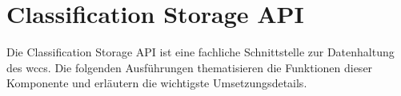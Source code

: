 \section{Classification Storage API}
    \label{section:solutionDetailsStorageAPI}
    Die Classification Storage API ist eine fachliche Schnittstelle zur Datenhaltung des \gls{wccs}.
    Die folgenden Ausführungen thematisieren die Funktionen dieser Komponente und erläutern die wichtigste Umsetzungsdetails.

    
    
    
    

